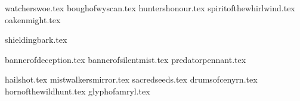 
\raggedcolumns
\begin{multicols}{2}

	\subtitle{\weaponenchantments}
	
	\startsortedpricelist
	
	{watcherswoe.tex}
	{boughofwyscan.tex}
	{huntershonour.tex}
	{spiritofthewhirlwind.tex}
	{oakenmight.tex}
	
	\endsortedpricelist

	\subtitle{\armourenchantments}
	
	\startsortedpricelist
	
	{shieldingbark.tex}

	\endsortedpricelist

	\subtitle{\bannerenchantments}

	\startsortedpricelist
	
	{bannerofdeception.tex}
	{bannerofsilentmist.tex}
	{predatorpennant.tex}

	\endsortedpricelist

	\subtitle{\artefacts}
	
	\startsortedpricelist


	{hailshot.tex}
	{mistwalkersmirror.tex}
	{sacredseeds.tex}
	{drumsofcenyrn.tex}
	{hornofthewildhunt.tex}
	{glyphofamryl.tex}

	\endsortedpricelist

\end{multicols}


